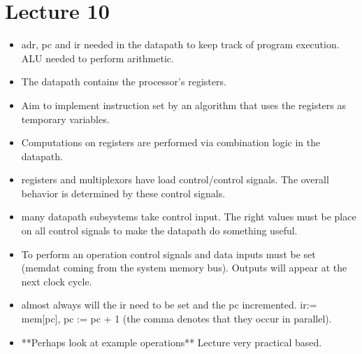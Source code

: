 \documentclass{article}
\begin{document}
\section*{Lecture 10}
\begin{itemize}
\item adr, pc and ir needed in the datapath to keep track of program execution. ALU needed to perform arithmetic.
\item The datapath contains the processor's registers. 
\item Aim to implement instruction set by an algorithm that uses the registers as temporary variables.
\item Computations on registers are performed via combination logic in the datapath.
\item registers and multiplexors have load control/control signals. The overall behavior is determined by these control signals.
\item many datapath subsystems take control input. The right values must be place on all control signals to make the datapath do something useful.
\item To perform an operation control signals and data inputs must be set (memdat coming from the system memory bus). Outputs will appear at the next clock cycle.
\item almost always will the ir need to be set and the pc incremented. ir:= mem[pc], pc := pc + 1 (the comma denotes that they occur in parallel).
\item **Perhaps look at example operations** Lecture very practical based.
\end{itemize}
\end{document}
